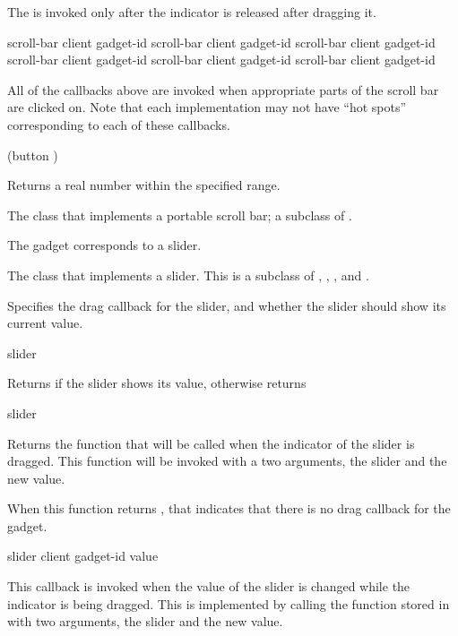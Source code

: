The  is invoked only after the indicator is released
after dragging it.

 {scroll-bar client gadget-id}
 {scroll-bar client gadget-id}
 {scroll-bar client gadget-id}
 {scroll-bar client gadget-id}
 {scroll-bar client gadget-id}
 {scroll-bar client gadget-id}

All of the callbacks above are invoked when appropriate parts of the scroll bar
are clicked on.  Note that each implementation may not have ``hot spots''
corresponding to each of these callbacks.

 {(button )}

Returns a real number within the specified range.


The class that implements a portable scroll bar; a subclass of .



The  gadget corresponds to a slider.


The class that implements a slider.  This is a subclass of ,
, , and .


Specifies the drag callback for the slider, and whether the slider should show
its current value.

 {slider}

Returns  if the slider shows its value, otherwise returns 

 {slider}

Returns the function that will be called when the indicator of the slider is
dragged.  This function will be invoked with a two arguments, the slider and the
new value.

When this function returns , that indicates that there is no drag
callback for the gadget.

 {slider client gadget-id value}

This callback is invoked when the value of the slider is changed while the
indicator is being dragged.  This is implemented by calling the function stored
in  with two arguments, the slider and the new value.

